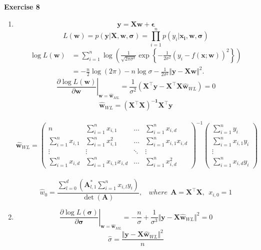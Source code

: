\documentclass[11pt,letter,notitlepage]{article}
\begin{document}
\begin{solution}
	\textbf{Exercise 8}
	\begin{enumerate}
		\item
		\[\mathbf{y=Xw+\epsilon}\]
		\[L(\mathbf{w})=p(\mathbf{y}\vert\mathbf{X,w,\sigma})=\prod_{i=1}^n{p(y_i\vert \mathbf{x_i,w,\sigma})}\]
		\begin{align*}
			\log L(\mathbf{w})
			&=\sum_{i=1}^n{\log\left(\frac{1}{\sqrt{2\pi\sigma^2}}\exp\left\{-\frac{1}{2\sigma^2}(y_i-f(\mathbf{x;w}))^2\right\}\right)}\\
			&=-\frac{n}{2}\log\left(2\pi\right)-n\log\sigma-\frac{1}{2\sigma^2}\Vert\mathbf{y-Xw}\Vert^2.
		\end{align*}
		\[\left.\frac{\partial\log L(\mathbf{w})}{\partial\mathbf{w}}\right|_{\mathbf{w}=\hat{\mathbf{w}}_{ML}}=\frac{1}{\sigma^2}\left(\mathbf{X^{\top}y-X^{\top}X}\hat{\mathbf{w}}_{WL}\right)=0\]
		\[\hat{\mathbf{w}}_{WL}=\mathbf{(X^{\top}X)^{-1}X^{\top}y}\]\\
		\[\hat{\mathbf{w}}_{WL}=
		\begin{pmatrix}
			n & \sum\limits_{i=1}^n{x_{i,1}}&\dots&\sum\limits_{i=1}^n{x_{i,d}}\\
			\sum\limits_{i=1}^n{x_{i,1}}&\sum\limits_{i=1}^n{x_{i,1}^2}&\dots&\sum\limits_{i=1}^n{x_{i,1} x_{i,d}}\\
			\vdots & \vdots & \ddots & \vdots\\
			\sum\limits_{i=1}^n{x_{i,d}} & \sum\limits_{i=1}^n{x_{i,1} x_{i,d}} &\dots & \sum\limits_{i=1}^n{x_{i,d}^2}
		\end{pmatrix}^{-1}
		\begin{pmatrix}
			\sum\limits_{i=1}^n{y_i}\\
			\sum\limits_{i=1}^n{x_{i,1}y_i}\\
			\vdots\\
			\sum\limits_{i=1}^n{x_{i,d}y_i}
		\end{pmatrix}
		\]\\
		\[\hat{w}_0=\frac{\sum\limits_{l=0}^d{\left(\mathbf{A}^*_{l,1}\sum\limits_{i=1}^n{x_{i,l}y_i}\right)}}{\det(\mathbf{A})},~~~~where~~\mathbf{A=X^{\top}X},~~x_{i,0}=1\]
		
		\item 
		\[\left.\frac{\partial\log L(\mathbf{\sigma})}{\partial\mathbf{\sigma}}\right|_{\mathbf{w}=\hat{\mathbf{w}}_{ML}}=-\frac{n}{\sigma}+\frac{1}{\sigma^3}\Vert \mathbf{y-X}\hat{\mathbf{w}}_{WL}\Vert^2=0\]
		\[\hat{\sigma}=\frac{\Vert \mathbf{y-X}\hat{\mathbf{w}}_{WL}\Vert^2}{n}\]
	\end{enumerate}
\end{solution}
\end{document}
